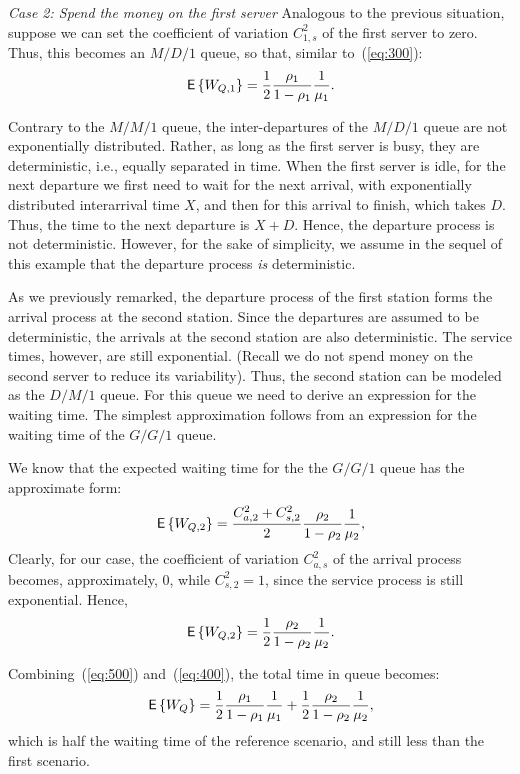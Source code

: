 \emph{Case 2: Spend the money on the first server} Analogous to the
previous situation, suppose we can set the coefficient of variation
$C_{1,s}^2$ of the first server to zero. Thus, this becomes an $M/D/1$
queue, so that, similar to~(\ref{eq:300}):
\begin{equation*}
\,\mathsf{E}\left\{W_{Q,1}\right\} = \frac{1}2\frac{\rho_1}{1-\rho_1} \frac1{\mu_1}.
\end{equation*}

Contrary to the $M/M/1$ queue, the inter-departures of the $M/D/1$
queue are not exponentially distributed. Rather, as long as the first
server is busy, they are deterministic, i.e., equally separated in
time.  When the first server is idle, for the next departure we first
need to wait for the next arrival, with exponentially distributed
interarrival time $X$, and then for this arrival to finish, which
takes $D$. Thus, the time to the next departure is $X+D$.  Hence, the
departure process is not deterministic. However, for the sake of
simplicity, we assume in the sequel of this example that the departure
process \emph{is} deterministic.

As we previously remarked, the departure process of the first station
forms the arrival process at the second station.  Since the departures
are assumed to be deterministic, the arrivals at the second station
are also deterministic.  The service times, however, are still
exponential.  (Recall we do not spend money on the second server to
reduce its variability). Thus, the second station can be modeled as
the $D/M/1$ queue. For this queue we need to derive an expression for
the waiting time. The simplest approximation follows from an
expression for the waiting time of the $G/G/1$ queue.

We know that the expected waiting time for the the $G/G/1$ queue has
the approximate form:
\begin{equation}\label{eq:500}
\,\mathsf{E}\left\{W_{Q,2}\right\} = \frac{C_{a,2}^2+C_{s,2}^2}2\frac{\rho_2}{1-\rho_2} \frac1{\mu_2},
\end{equation}
Clearly, for our case, the coefficient of  variation $C_{a,s}^2$ of the
arrival process becomes, approximately, $0$, while $C_{s,2}^2 = 1$,
since the service process is still exponential. Hence,
\begin{equation}\label{eq:400}
\,\mathsf{E}\left\{W_{Q,2}\right\} = \frac12\frac{\rho_2}{1-\rho_2} \frac1{\mu_2}.
\end{equation}

Combining~(\ref{eq:500}) and~(\ref{eq:400}), the total  time in queue
becomes:
\begin{equation*}
  \,\mathsf{E}\left\{W_Q\right\}= \frac12\frac{\rho_1}{1-\rho_1} \frac1{\mu_1} +
  \frac12\frac{\rho_2}{1-\rho_2} \frac1{\mu_2}, 
\end{equation*}
which is half the waiting time of the reference scenario, and still
less than the first scenario.

